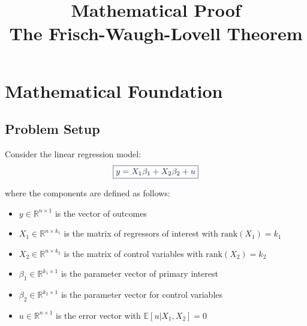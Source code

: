 \documentclass[11pt,letterpaper]{article}
\title{%
    \vspace{-1cm}
    {\Huge\bfseries\color{primaryblue} Mathematical Proof} \\[0.4cm]
    {\Large\color{accentblue} The Frisch-Waugh-Lovell Theorem} \\[0.8cm]
}
\author{}
\date{}
\theoremstyle{definition}
\newcommand{\R}{\mathbb{R}}
\newcommand{\E}{\mathbb{E}}
\newcommand{\rank}{\text{rank}}
\begin{document}
\maketitle
\thispagestyle{empty}


\section{Mathematical Foundation}

\subsection{Problem Setup}

Consider the linear regression model:
\begin{equation}\label{eq:model}
\textcolor{primaryblue}{\boxed{y = X_1\beta_1 + X_2\beta_2 + u}}
\end{equation}

\noindent where the components are defined as follows:

\begin{itemize}[itemsep=0.8em, leftmargin=2.5em]
    \item $y \in \R^{n \times 1}$ is the vector of outcomes
    \item $X_1 \in \R^{n \times k_1}$ is the matrix of regressors of interest with $\rank(X_1) = k_1$
    \item $X_2 \in \R^{n \times k_2}$ is the matrix of control variables with $\rank(X_2) = k_2$
    \item $\beta_1 \in \R^{k_1 \times 1}$ is the parameter vector of primary interest
    \item $\beta_2 \in \R^{k_2 \times 1}$ is the parameter vector for control variables
    \item $u \in \R^{n \times 1}$ is the error vector with $\E[u|X_1,X_2] = 0$
\end{itemize}
\end{document}
